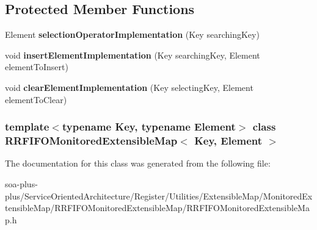\subsection*{Protected Member Functions}
\begin{DoxyCompactItemize}
\item 
\hypertarget{class_r_r_f_i_f_o_monitored_extensible_map_a3ceddc181524596d209d8eb50987d685}{
Element {\bfseries selectionOperatorImplementation} (Key searchingKey)}
\label{class_r_r_f_i_f_o_monitored_extensible_map_a3ceddc181524596d209d8eb50987d685}

\item 
\hypertarget{class_r_r_f_i_f_o_monitored_extensible_map_a7dcc7da9a7facb69b26275b497a7302d}{
void {\bfseries insertElementImplementation} (Key searchingKey, Element elementToInsert)}
\label{class_r_r_f_i_f_o_monitored_extensible_map_a7dcc7da9a7facb69b26275b497a7302d}

\item 
\hypertarget{class_r_r_f_i_f_o_monitored_extensible_map_a16a4bd40c034e3ac4381c66fc1e7f4d8}{
void {\bfseries clearElementImplementation} (Key selectingKey, Element elementToClear)}
\label{class_r_r_f_i_f_o_monitored_extensible_map_a16a4bd40c034e3ac4381c66fc1e7f4d8}

\end{DoxyCompactItemize}
\subsubsection*{template$<$typename Key, typename Element$>$ class RRFIFOMonitoredExtensibleMap$<$ Key, Element $>$}



The documentation for this class was generated from the following file:\begin{DoxyCompactItemize}
\item 
soa-\/plus-\/plus/ServiceOrientedArchitecture/Register/Utilities/ExtensibleMap/MonitoredExtensibleMap/RRFIFOMonitoredExtensibleMap/RRFIFOMonitoredExtensibleMap.h\end{DoxyCompactItemize}
